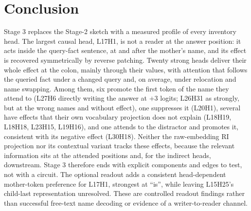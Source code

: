 \documentclass[11pt,a4paper]{article}
\begin{document}
\section{Conclusion}
Stage 3 replaces the Stage-2 sketch with a measured profile of every inventory head.
The largest causal head, L17H1, is not a reader at the answer position: it acts inside
the query-fact sentence, at and after the mother's name, and its effect is recovered
symmetrically by reverse patching. Twenty strong heads deliver their whole effect at
the colon, mainly through their values, with attention that follows the queried fact
under a changed query and, on average, under relocation and name swapping. Among them,
six promote the first token of the name they attend to (L27H6 directly writing the
answer at $+3$ logits; L26H31 as strongly, but at the wrong names and without effect),
one suppresses it (L20H1), several have effects that their own vocabulary projection
does not explain (L18H19, L18H18, L23H15, L19H16), and one attends to the distractor
and promotes it, consistent with its negative effect (L30H18). Neither the raw-embedding RI projection nor its
contextual variant tracks these effects, because the relevant information sits at the
attended positions and, for the indirect heads, downstream. Stage 3 therefore ends
with explicit components and edges to test, not with a circuit. The optional
readout adds a consistent head-dependent mother-token preference for L17H1, strongest
at ``is'', while leaving L15H25's child-last representation unresolved. These are
controlled readout findings rather than successful free-text name decoding or
evidence of a writer-to-reader channel.
\end{document}
